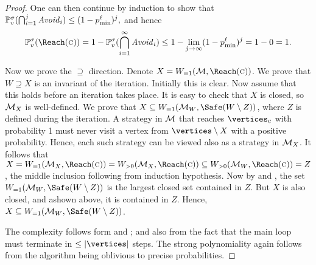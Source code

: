 \begin{proof}
\noindent
One can then continue by induction to show that $\mathbb{P}^{\sigma}_{v}(\bigcap_{i=1}^j \mathit{Avoid}_i)\leq (1-p_{\min}^\ell)^{j},$ and hence
$$\probm^\sigma_{v}(\Reach(\genColour))= 1-\probm^{\sigma}_{v}(\bigcap_{i=1}^\infty \mathit{Avoid}_i) \leq 1-\lim_{j\rightarrow \infty}(1-p_{\min}^\ell)^{j}= 1-0=1.$$

Now we prove the $ \supseteq $ direction. Denote $X=\winAS(\mdp,\Reach(\genColour))$. We prove that $ W \supseteq X $ is an invariant of the iteration. Initially this is clear. Now assume that this holds before an iteration takes place. It is easy to check that $X$ is closed, so $\mathcal{M}_{X}$ is well-defined. We prove that $ X \subseteq \winAS(\mdp_W,\Safe(W\setminus Z)) $, where $ Z $ is defined during the iteration. A strategy in $\mathcal{M}$ that reaches $\vertices_{\genColour}$ with probability 1 must never visit a vertex from $\vertices\setminus X$ with a positive probability. Hence, each such strategy can be viewed also as a strategy in $\mathcal{M}_{X}$. It follows that  $X=\winAS(\mdp_X,\Reach(\genColour)) = \winPos(\mdp_{X},\Reach(\genColour)) \subseteq \winPos(\mdp_{W},\Reach(\genColour)) = Z$, the middle inclusion following from induction hypothesis. Now by  and , the set $ \winAS(\mdp_W,\Safe(W\setminus Z)) $ is the largest closed set contained in $ Z $. But $ X $ is also closed, and ashown above, it is contained in $ Z $. Hence,  $ X \subseteq \winAS(\mdp_W,\Safe(W \setminus Z)) $.

The complexity follows form  and ; and also from the fact that the main loop must terminate in $ \leq |\vertices| $ steps. The strong polynomiality again follows from the algorithm being oblivious to precise probabilities.
\end{proof}



